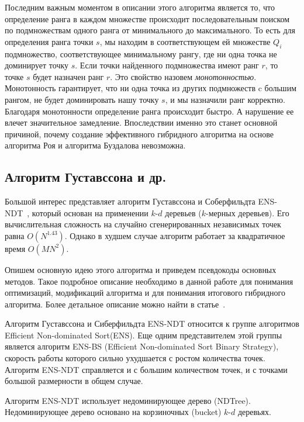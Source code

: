 
Последним важным моментом в описании этого алгоритма является то, что определение ранга в каждом множестве происходит последовательным поиском по подмножествам одного ранга от минимального до максимального. То есть для определения ранга точки $s$, мы находим в соответствующем ей множестве $Q_i$ подмножество, соответствующее минимальному рангу, где ни одна точка не доминирует точку $s$. Если точки найденного подмножества имеют ранг $r$, то точке $s$ будет назначен ранг $r$. Это свойство назовем \emph{монотонностью}. Монотонность гарантирует, что ни одна точка из других подмножеств c большим рангом, не будет доминировать нашу точку $s$, и мы назначили ранг корректно. Благодаря монотонности определение ранга происходит быстро. А нарушение ее влечет значительное замедление. Впоследствии именно это станет основной причиной, почему создание эффективного гибридного алгоритма на основе алгоритма Роя и алгоритма Буздалова невозможна. 

\subsection{Алгоритм Густавссона и др.}

Большой интерес представляет алгоритм Густавссона и Соберфильдта ENS-NDT~\cite{Gustavsson}, который основан на применении $k$-$d$ деревьев ($k$-мерных деревьев). Его вычислительная сложность на случайно сгенерированных независимых точек равна $O(N^{1.43})$. Однако в худшем случае алгоритм работает за квадратичное время $O(MN^2)$.

Опишем основную идею этого алгоритма и приведем псевдокоды основных методов. Такое подробное описание необходимо в данной работе для понимания оптимизаций, модификаций алгоритма и для понимания итогового гибридного алгоритма. Более детальное описание можно найти в статье~\cite{Gustavsson}.

Алгоритм Густавссона и Сиберфильдта ENS-NDT относится к группе алгоритмов Efficient Non-dominated Sort(ENS). Еще одним представителем этой группы является алгоритм ENS-BS (Efficient Non-dominated Sort Binary Strategy), скорость работы которого сильно ухудшается с ростом количества точек. Алгоритм ENS-NDT справляется и с большим количеством точек, и с точками большой размерности в общем случае.

Алгоритм ENS-NDT использует недоминирующее дерево (NDTree). Недоминирующее дерево основано на корзиночных (bucket) $k$-$d$ деревьях. 

